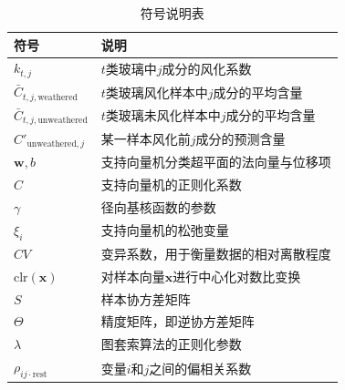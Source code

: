 \begin{table}[H]
	\centering
	\caption{符号说明表}
	\begin{tabular}{ll}
		\toprule
		\textbf{符号}                        & \textbf{说明}                     \\
		\midrule
		$k_{t,j}$                          & $t$类玻璃中$j$成分的风化系数               \\
		$\bar{C}_{t,j,\text{weathered}}$   & $t$类玻璃风化样本中$j$成分的平均含量           \\
		$\bar{C}_{t,j,\text{unweathered}}$ & $t$类玻璃未风化样本中$j$成分的平均含量          \\
		$C'_{\text{unweathered}, j}$       & 某一样本风化前$j$成分的预测含量               \\
		$\boldsymbol{w}, b$                & 支持向量机分类超平面的法向量与位移项              \\
		$C$                                & 支持向量机的正则化系数                     \\
		$\gamma$                           & 径向基核函数的参数                       \\
		$\xi_i$                            & 支持向量机的松弛变量                      \\
		$CV$                               & 变异系数，用于衡量数据的相对离散程度              \\
		$\text{clr}(\boldsymbol{x})$       & 对样本向量$\boldsymbol{x}$进行中心化对数比变换 \\
		$S$                                & 样本协方差矩阵                         \\
		$\Theta$                           & 精度矩阵，即逆协方差矩阵                    \\
		$\lambda$                          & 图套索算法的正则化参数                     \\
		$\rho_{ij \cdot \text{rest}}$      & 变量$i$和$j$之间的偏相关系数               \\

		\bottomrule
	\end{tabular}
\end{table}